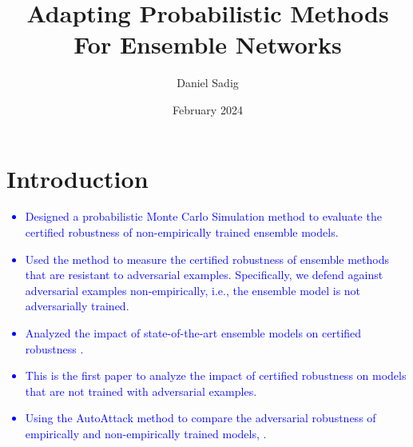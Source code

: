\documentclass{article}
\title{Adapting Probabilistic Methods For Ensemble Networks}
\author{Daniel Sadig}
\date{February 2024}
\begin{document}
\maketitle

\section{Introduction}
\textcolor{blue}{
\begin{itemize}
    \item Designed a probabilistic Monte Carlo Simulation method to evaluate the certified robustness of non-empirically trained ensemble models.
    \item Used the method to measure the certified robustness of ensemble methods that are resistant to adversarial examples. Specifically, we defend against adversarial examples non-empirically, i.e., the ensemble model is not adversarially trained.
    \item Analyzed the impact of state-of-the-art ensemble models on certified robustness \cite{reference1}.
    \item This is the first paper to analyze the impact of certified robustness on models that are not trained with adversarial examples.
    \item Using the AutoAttack method to compare the adversarial robustness of empirically and non-empirically trained models, \cite{reference5}.
\end{itemize}
}
\end{document}
